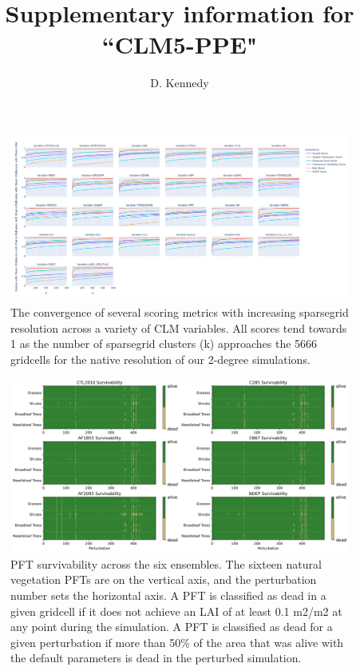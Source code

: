\documentclass[11pt]{article}
\title{Supplementary information for ``CLM5-PPE"}
\author{D. Kennedy}
\begin{document}
\maketitle



\begin{landscape}
\begin{figure}[h]
\centering
\includegraphics[width=60pc]{../figs/supp/ilamb_lines.png}
\caption{The convergence of several scoring metrics with increasing sparsegrid resolution across a variety of CLM variables. All scores tend towards 1 as the number of sparsegrid clusters (k) approaches the 5666 gridcells for the native resolution of our 2-degree simulations. }
\label{supp:ilamb}
\end{figure}
\end{landscape}



\begin{landscape}
\begin{figure}[h]
\centering
\includegraphics[width=50pc]{../figs/supp/survivability.png}
\caption{PFT survivability across the six ensembles. The sixteen natural vegetation PFTs are on the vertical axis, and the perturbation number sets the horizontal axis. A PFT is classified as dead in a given gridcell if it does not achieve an LAI of at least 0.1 m2/m2 at any point during the simulation. A PFT is classified as dead for a given perturbation if more than 50\% of the area that was alive with the default parameters is dead in the perturbed simulation.}
\label{supp:surv}
\end{figure}
\end{landscape}
\end{document}
